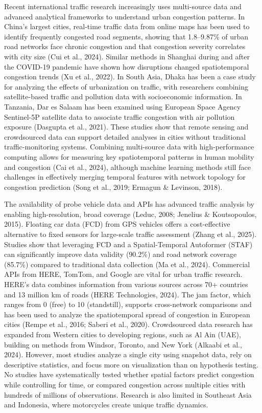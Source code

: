 \documentclass[12pt,a4paper]{article}
\begin{document}
Recent international traffic research increasingly uses multi-source data and advanced analytical frameworks to understand urban congestion patterns. In China's largest cities, real-time traffic data from online maps has been used to identify frequently congested road segments, showing that 1.8--9.87\% of urban road networks face chronic congestion and that congestion severity correlates with city size (Cui et al., 2024). Similar methods in Shanghai during and after the COVID-19 pandemic have shown how disruptions changed spatiotemporal congestion trends (Xu et al., 2022). In South Asia, Dhaka has been a case study for analyzing the effects of urbanization on traffic, with researchers combining satellite-based traffic and pollution data with socioeconomic information. In Tanzania, Dar es Salaam has been examined using European Space Agency Sentinel-5P satellite data to associate traffic congestion with air pollution exposure (Dasgupta et al., 2021). These studies show that remote sensing and crowdsourced data can support detailed analyses in cities without traditional traffic-monitoring systems. Combining multi-source data with high-performance computing allows for measuring key spatiotemporal patterns in human mobility and congestion (Cai et al., 2024), although machine learning methods still face challenges in effectively merging temporal features with network topology for congestion prediction (Song et al., 2019; Ermagun \& Levinson, 2018).

The availability of probe vehicle data and APIs has advanced traffic analysis by enabling high-resolution, broad coverage (Leduc, 2008; Jenelius \& Koutsopoulos, 2015). Floating car data (FCD) from GPS vehicles offers a cost-effective alternative to fixed sensors for large-scale traffic assessment (Zhang et al., 2025). Studies show that leveraging FCD and a Spatial-Temporal Autoformer (STAF) can significantly improve data validity (90.2\%) and road network coverage (85.7\%) compared to traditional data collection (Ma et al., 2024). Commercial APIs from HERE, TomTom, and Google are vital for urban traffic research. HERE's data combines information from various sources across 70+ countries and 13 million km of roads (HERE Technologies, 2024). The jam factor, which ranges from 0 (free) to 10 (standstill), supports cross-network comparisons and has been used to analyze the spatiotemporal spread of congestion in European cities (Rempe et al., 2016; Saberi et al., 2020). Crowdsourced data research has expanded from Western cities to developing regions, such as Al Ain (UAE), building on methods from Windsor, Toronto, and New York (Alkaabi et al., 2024). However, most studies analyze a single city using snapshot data, rely on descriptive statistics, and focus more on visualization than on hypothesis testing. No studies have systematically tested whether spatial factors predict congestion while controlling for time, or compared congestion across multiple cities with hundreds of millions of observations. Research is also limited in Southeast Asia and Indonesia, where motorcycles create unique traffic dynamics.
\end{document}
